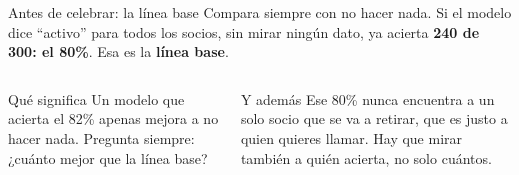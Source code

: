 \documentclass[aspectratio=169,11pt]{beamer}
\begin{document}
\begin{frame}[t]{Antes de celebrar: la línea base}
  \small
  Compara siempre con no hacer nada. Si el modelo dice ``activo'' para todos los socios, sin mirar ningún dato,
  ya acierta \textbf{240 de 300: el 80\%}. Esa es la \textbf{línea base}.
  \vspace{0.15cm}
  \begin{center}
  \end{center}
  \begin{columns}[T,onlytextwidth]
    \begin{block}{Qué significa}
      \footnotesize Un modelo que acierta el 82\% apenas mejora a no
      hacer nada. Pregunta siempre: ¿cuánto mejor que la línea base?
    \end{block}
    \begin{block}{Y además}
      \footnotesize Ese 80\% nunca encuentra a un solo socio que se va a
      retirar, que es justo a quien quieres llamar. Hay que mirar también
      a quién acierta, no solo cuántos.
    \end{block}
  \end{columns}
\end{frame}
\end{document}
